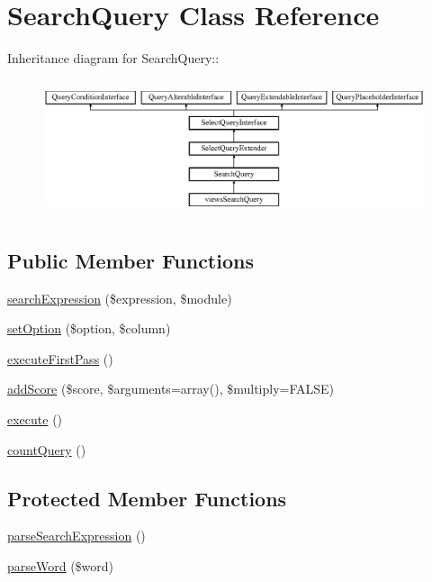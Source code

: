 \hypertarget{classSearchQuery}{
\section{SearchQuery Class Reference}
\label{classSearchQuery}
}
Inheritance diagram for SearchQuery::\begin{figure}[H]
\begin{center}
\leavevmode
\includegraphics[height=4.02299cm]{classSearchQuery}
\end{center}
\end{figure}
\subsection*{Public Member Functions}
\begin{DoxyCompactItemize}
\item 
\hyperlink{classSearchQuery_a29e645e6deda9aa994b9b6e24384e21a}{searchExpression} (\$expression, \$module)
\item 
\hyperlink{classSearchQuery_a8923957ea4c9d231d1975c249ebe2601}{setOption} (\$option, \$column)
\item 
\hyperlink{classSearchQuery_a26f4f25d5720b6858c06fed4785914d7}{executeFirstPass} ()
\item 
\hyperlink{classSearchQuery_a72dc185ab8034f0979d877b6b9c57b1c}{addScore} (\$score, \$arguments=array(), \$multiply=FALSE)
\item 
\hyperlink{classSearchQuery_acedd13d6590d0013488873ec33fc6482}{execute} ()
\item 
\hyperlink{classSearchQuery_a01dea1649b1e99312abf12760b1b89e2}{countQuery} ()
\end{DoxyCompactItemize}
\subsection*{Protected Member Functions}
\begin{DoxyCompactItemize}
\item 
\hyperlink{classSearchQuery_adbb7c8e1b7f6ff56b168cce84b4b38d0}{parseSearchExpression} ()
\item 
\hyperlink{classSearchQuery_a5a2743ed22476b614f9feed7d7bb7df9}{parseWord} (\$word)
\end{DoxyCompactItemize}

